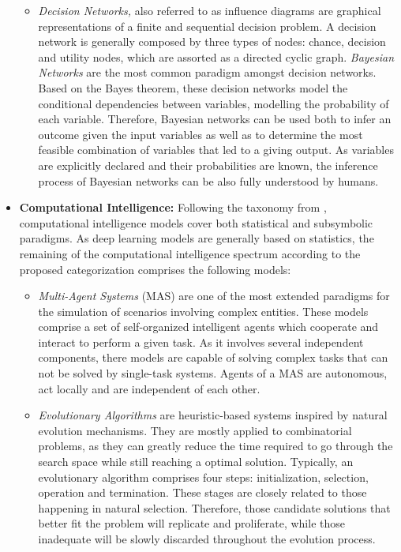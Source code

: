 \begin{itemize}
\begin{itemize}
        \item \textit{Decision Networks,} also referred to as influence diagrams \citep{poole_2017_ai_foundations} are graphical representations of a finite and sequential decision problem. A decision network is generally composed by three types of nodes: chance, decision and utility nodes, which are assorted as a directed cyclic graph. \textit{Bayesian Networks} \citep{friedman_1997_bayesian} are the most common paradigm amongst decision networks. Based on the Bayes theorem, these decision networks model the conditional dependencies between variables, modelling the probability of each variable. Therefore, Bayesian networks can be used both to infer an outcome given the input variables as well as to determine the most feasible combination of variables that led to a giving output. As variables are explicitly declared and their probabilities are known, the inference process of Bayesian networks can be also fully understood by humans.
    \end{itemize}
    \item \textbf{Computational Intelligence:} Following the taxonomy from \citep{corea_ai_2019}, computational intelligence models cover both statistical and subsymbolic paradigms. As deep learning models are generally based on statistics, the remaining of the computational intelligence spectrum according to the proposed categorization comprises the following models:
    \begin{itemize}
        \item \textit{Multi-Agent Systems} (MAS) \citep{Ferber:1999:MSI:520715} are one of the most extended paradigms for the simulation of scenarios involving complex entities. These models comprise a set of self-organized intelligent agents which cooperate and interact to perform a given task. As it involves several independent components, there models are capable of solving complex tasks that can not be solved by single-task systems. Agents of a MAS are autonomous, act locally and are independent of each other. 
        \item \textit{Evolutionary Algorithms} \cite{GALVAN2003573} are heuristic-based systems inspired by natural evolution mechanisms. They are mostly applied to combinatorial problems, as they can greatly reduce the time required to go through the search space while still reaching a optimal solution. Typically, an evolutionary algorithm comprises four steps: initialization, selection, operation and termination. These stages are closely related to those happening in natural selection. Therefore, those candidate solutions that better fit the problem will replicate and proliferate, while those inadequate will be slowly discarded throughout the evolution process. 

\end{itemize}
\end{itemize}
